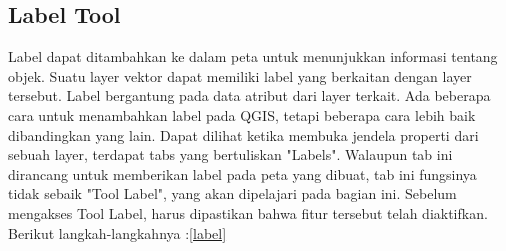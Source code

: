 \subsection{Label Tool}
Label dapat ditambahkan ke dalam peta untuk menunjukkan informasi tentang objek. Suatu layer vektor dapat memiliki label yang berkaitan dengan layer tersebut. Label bergantung pada data atribut dari layer terkait.
Ada beberapa cara untuk menambahkan label pada QGIS, tetapi beberapa cara lebih baik dibandingkan yang lain. Dapat dilihat ketika membuka jendela properti dari sebuah layer, terdapat tabs yang bertuliskan "Labels". Walaupun tab ini dirancang untuk memberikan label pada peta yang dibuat, tab ini fungsinya tidak sebaik "Tool Label", yang akan dipelajari pada bagian ini. Sebelum mengakses Tool Label, harus dipastikan bahwa fitur tersebut telah diaktifkan. Berikut langkah-langkahnya :\ref{label}
